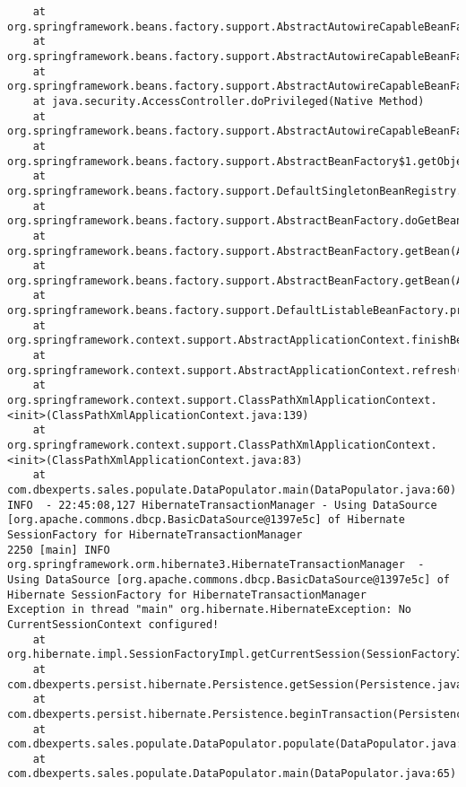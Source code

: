 \begin{verbatim}
	at org.springframework.beans.factory.support.AbstractAutowireCapableBeanFactory.initializeBean(AbstractAutowireCapableBeanFactory.java:1335)
	at org.springframework.beans.factory.support.AbstractAutowireCapableBeanFactory.doCreateBean(AbstractAutowireCapableBeanFactory.java:473)
	at org.springframework.beans.factory.support.AbstractAutowireCapableBeanFactory$1.run(AbstractAutowireCapableBeanFactory.java:409)
	at java.security.AccessController.doPrivileged(Native Method)
	at org.springframework.beans.factory.support.AbstractAutowireCapableBeanFactory.createBean(AbstractAutowireCapableBeanFactory.java:380)
	at org.springframework.beans.factory.support.AbstractBeanFactory$1.getObject(AbstractBeanFactory.java:264)
	at org.springframework.beans.factory.support.DefaultSingletonBeanRegistry.getSingleton(DefaultSingletonBeanRegistry.java:222)
	at org.springframework.beans.factory.support.AbstractBeanFactory.doGetBean(AbstractBeanFactory.java:261)
	at org.springframework.beans.factory.support.AbstractBeanFactory.getBean(AbstractBeanFactory.java:185)
	at org.springframework.beans.factory.support.AbstractBeanFactory.getBean(AbstractBeanFactory.java:164)
	at org.springframework.beans.factory.support.DefaultListableBeanFactory.preInstantiateSingletons(DefaultListableBeanFactory.java:423)
	at org.springframework.context.support.AbstractApplicationContext.finishBeanFactoryInitialization(AbstractApplicationContext.java:728)
	at org.springframework.context.support.AbstractApplicationContext.refresh(AbstractApplicationContext.java:380)
	at org.springframework.context.support.ClassPathXmlApplicationContext.<init>(ClassPathXmlApplicationContext.java:139)
	at org.springframework.context.support.ClassPathXmlApplicationContext.<init>(ClassPathXmlApplicationContext.java:83)
	at com.dbexperts.sales.populate.DataPopulator.main(DataPopulator.java:60)
INFO  - 22:45:08,127 HibernateTransactionManager - Using DataSource [org.apache.commons.dbcp.BasicDataSource@1397e5c] of Hibernate SessionFactory for HibernateTransactionManager
2250 [main] INFO org.springframework.orm.hibernate3.HibernateTransactionManager  - Using DataSource [org.apache.commons.dbcp.BasicDataSource@1397e5c] of Hibernate SessionFactory for HibernateTransactionManager
Exception in thread "main" org.hibernate.HibernateException: No CurrentSessionContext configured!
	at org.hibernate.impl.SessionFactoryImpl.getCurrentSession(SessionFactoryImpl.java:572)
	at com.dbexperts.persist.hibernate.Persistence.getSession(Persistence.java:33)
	at com.dbexperts.persist.hibernate.Persistence.beginTransaction(Persistence.java:93)
	at com.dbexperts.sales.populate.DataPopulator.populate(DataPopulator.java:39)
	at com.dbexperts.sales.populate.DataPopulator.main(DataPopulator.java:65)

\end{verbatim}









